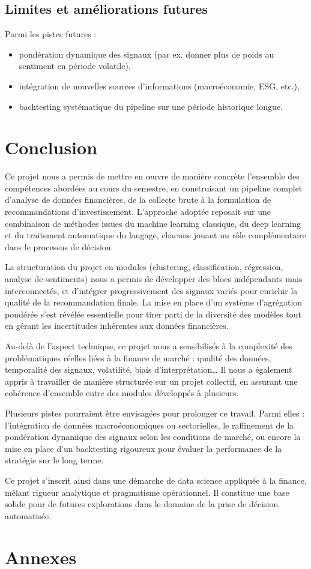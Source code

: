 \documentclass[a4paper,12pt]{article}
\begin{document}
\subsection*{Limites et améliorations futures}

Parmi les pistes futures :
\begin{itemize}
    \item pondération dynamique des signaux (par ex. donner plus de poids au sentiment en période volatile),
    \item intégration de nouvelles sources d’informations (macroéconomie, ESG, etc.),
    \item backtesting systématique du pipeline sur une période historique longue.
\end{itemize}

\section{Conclusion}

Ce projet nous a permis de mettre en œuvre de manière concrète l’ensemble des compétences abordées au cours du semestre, en construisant un pipeline complet d’analyse de données financières, de la collecte brute à la formulation de recommandations d’investissement. L’approche adoptée reposait sur une combinaison de méthodes issues du machine learning classique, du deep learning et du traitement automatique du langage, chacune jouant un rôle complémentaire dans le processus de décision.

La structuration du projet en modules (clustering, classification, régression, analyse de sentiments) nous a permis de développer des blocs indépendants mais interconnectés, et d’intégrer progressivement des signaux variés pour enrichir la qualité de la recommandation finale. La mise en place d’un système d’agrégation pondérée s’est révélée essentielle pour tirer parti de la diversité des modèles tout en gérant les incertitudes inhérentes aux données financières.

Au-delà de l’aspect technique, ce projet nous a sensibilisés à la complexité des problématiques réelles liées à la finance de marché : qualité des données, temporalité des signaux, volatilité, biais d’interprétation… Il nous a également appris à travailler de manière structurée sur un projet collectif, en assurant une cohérence d’ensemble entre des modules développés à plusieurs.

Plusieurs pistes pourraient être envisagées pour prolonger ce travail. Parmi elles : l’intégration de données macroéconomiques ou sectorielles, le raffinement de la pondération dynamique des signaux selon les conditions de marché, ou encore la mise en place d’un backtesting rigoureux pour évaluer la performance de la stratégie sur le long terme.

Ce projet s’inscrit ainsi dans une démarche de data science appliquée à la finance, mêlant rigueur analytique et pragmatisme opérationnel. Il constitue une base solide pour de futures explorations dans le domaine de la prise de décision automatisée.

\newpage
\section{Annexes}
\printbibliography
\end{document}
